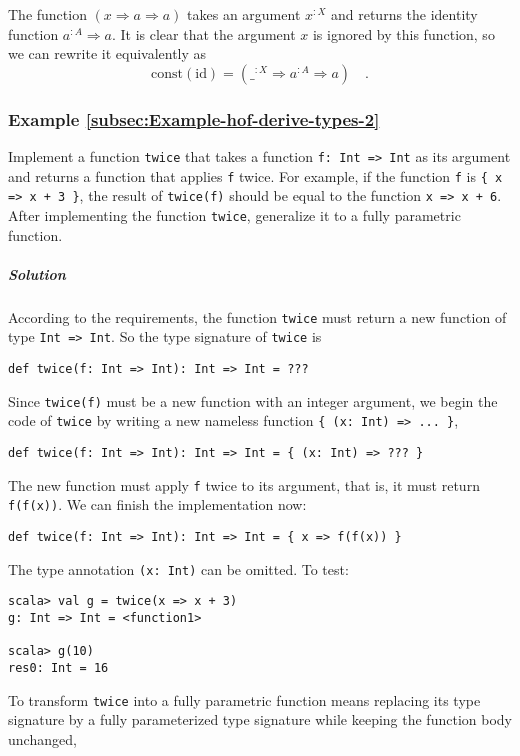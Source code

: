 The function $\left(x\Rightarrow a\Rightarrow a\right)$ takes an
argument $x^{:X}$ and returns the identity function $a^{:A}\Rightarrow a$.
It is clear that the argument $x$ is ignored by this function, so
we can rewrite it equivalently as
\[
\text{const}\left(\text{id}\right)=(\_^{:X}\Rightarrow a^{:A}\Rightarrow a)\quad.
\]


\subsubsection{Example \label{subsec:Example-hof-derive-types-2}\ref{subsec:Example-hof-derive-types-2}}

Implement a function \lstinline!twice! that takes a function \lstinline!f: Int => Int!
as its argument and returns a function that applies \lstinline!f!
twice. For example, if the function \lstinline!f! is \lstinline!{ x => x + 3 }!,
the result of \lstinline!twice(f)! should be equal to the function
\lstinline!x => x + 6!. After implementing the function \lstinline!twice!,
generalize it to a fully parametric function.

\subparagraph{Solution}

According to the requirements, the function \lstinline!twice! must
return a new function of type \lstinline!Int => Int!. So the type
signature of \lstinline!twice! is
\begin{lstlisting}
def twice(f: Int => Int): Int => Int = ???
\end{lstlisting}
Since \lstinline!twice(f)! must be a new function with an integer
argument, we begin the code of \lstinline!twice! by writing a new
nameless function \lstinline!{ (x: Int) => ... }!,
\begin{lstlisting}
def twice(f: Int => Int): Int => Int = { (x: Int) => ??? }
\end{lstlisting}
The new function must apply \lstinline!f! twice to its argument,
that is, it must return \lstinline!f(f(x))!. We can finish the implementation
now:
\begin{lstlisting}
def twice(f: Int => Int): Int => Int = { x => f(f(x)) }
\end{lstlisting}
The type annotation \lstinline!(x: Int)! can be omitted. To test:
\begin{lstlisting}
scala> val g = twice(x => x + 3)
g: Int => Int = <function1>

scala> g(10)
res0: Int = 16
\end{lstlisting}

To transform \lstinline!twice! into a fully parametric function means
replacing its type signature by a fully parameterized type signature
while keeping the function body unchanged,

